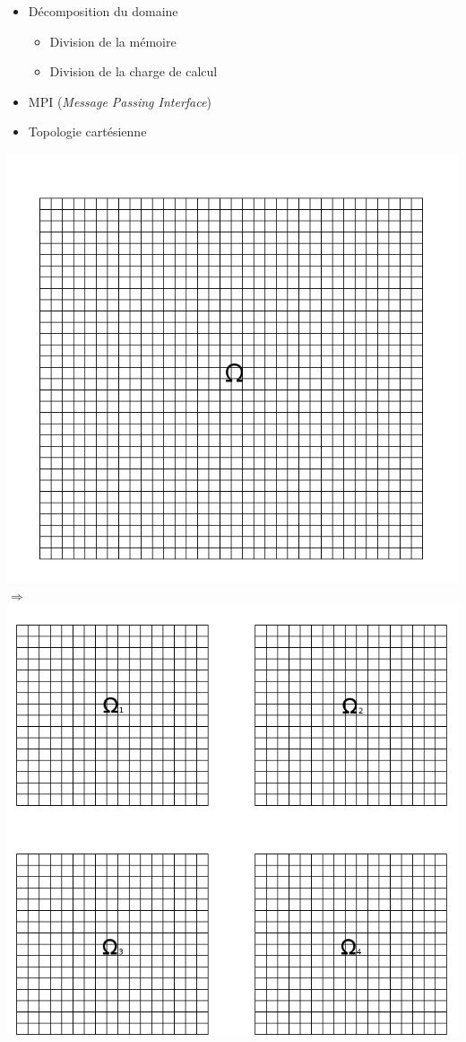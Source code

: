 \documentclass{beamer}
\begin{document}
\begin{frame}
  \begin{itemize}
  \item Décomposition du domaine
    \begin{itemize}
    \item Division de la mémoire 
    \item Division de la charge de calcul
    \end{itemize}
  \item MPI (\textit{Message Passing Interface})
  \item Topologie cartésienne 
  \end{itemize}

  \centering
  \includegraphics[scale=0.15]{slide_decompo_1.png}$\Rightarrow$
  \includegraphics[scale=0.15]{slide_decompo_2.png}
\end{frame}
\end{document}
